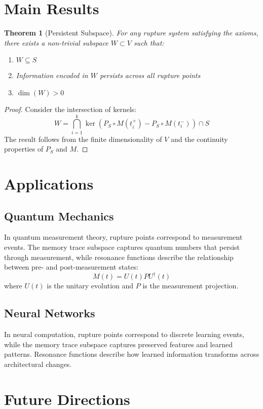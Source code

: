 \documentclass[12pt]{article}
\theoremstyle{definition}
\theoremstyle{plain}
\newtheorem{theorem}{Theorem}
\begin{document}
\section{Main Results}

\begin{theorem}[Persistent Subspace]
For any rupture system satisfying the axioms, there exists a non-trivial subspace $W \subset V$ such that:
\begin{enumerate}
    \item $W \subseteq S$
    \item Information encoded in $W$ persists across all rupture points
    \item $\dim(W) > 0$
\end{enumerate}
\end{theorem}

\begin{proof}
Consider the intersection of kernels:
\[ W = \bigcap_{i=1}^k \ker(P_S \circ M(t_i^+) - P_S \circ M(t_i^-)) \cap S \]
The result follows from the finite dimensionality of $V$ and the continuity properties of $P_S$ and $M$.
\end{proof}

\section{Applications}

\subsection{Quantum Mechanics}
In quantum measurement theory, rupture points correspond to measurement events. The memory trace subspace captures quantum numbers that persist through measurement, while resonance functions describe the relationship between pre- and post-measurement states:
\[ M(t) = U(t)PU^\dagger(t) \]
where $U(t)$ is the unitary evolution and $P$ is the measurement projection.

\subsection{Neural Networks}
In neural computation, rupture points correspond to discrete learning events, while the memory trace subspace captures preserved features and learned patterns. Resonance functions describe how learned information transforms across architectural changes.

\section{Future Directions}
\end{document}
